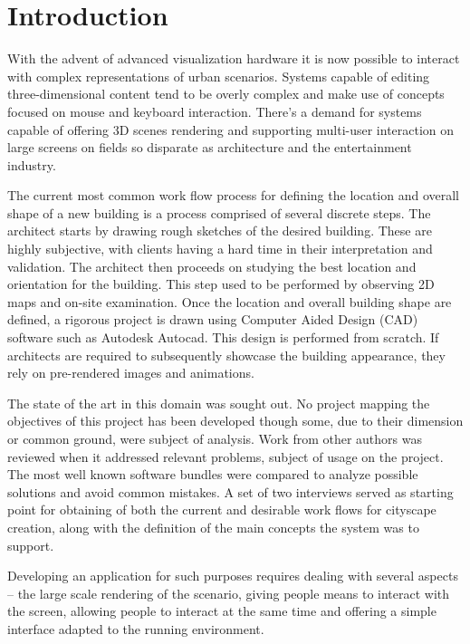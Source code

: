 \section{Introduction}



With the advent of advanced visualization hardware it is now possible
to interact with complex representations of urban scenarios.
Systems capable of editing three-dimensional content
tend to be overly complex and make use of concepts
focused on mouse and keyboard interaction.
There's a demand for systems capable of offering 3D scenes rendering
and supporting multi-user interaction on large screens on fields
so disparate as architecture and the entertainment industry.

The current most common work flow process for defining the location and overall shape
of a new building is a process comprised of several discrete steps.
The architect starts by drawing rough sketches of the desired building.
These are highly subjective, with clients having a hard time in their interpretation and validation.
The architect then proceeds on studying the best location and orientation for the building.
This step used to be performed by observing 2D maps and on-site examination.
Once the location and overall building shape are defined, a rigorous project is drawn using
Computer Aided Design (CAD) software such as Autodesk Autocad\cite{SITE-AUTOCAD}.
This design is performed from scratch.
If architects are required to subsequently showcase the building appearance,
they rely on pre-rendered images and animations.



The state of the art in this domain was sought out. No project mapping the objectives of this project
has been developed though some, due to their dimension or common ground, were subject of analysis.
Work from other authors was reviewed when it addressed relevant problems, subject of usage on the project.
The most well known software bundles were compared to analyze possible solutions and avoid common mistakes.
A set of two interviews served as starting point for obtaining of both the current and desirable work flows
for cityscape creation, along with the definition of the main concepts the system was to support.



Developing an application for such purposes requires dealing with several aspects
-- the large scale rendering of the scenario,
giving people means to interact with the screen,
allowing people to interact at the same time and
offering a simple interface adapted to the running environment.


